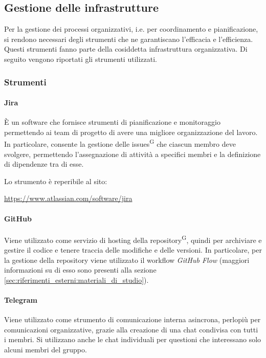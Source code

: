 \subsection{Gestione delle infrastrutture}\label{sec:processi_organizzativi:gestione_infrastrutture}
Per la gestione dei processi organizzativi, i.e. per coordinamento e pianificazione, si rendono necessari degli strumenti che ne garantiscano l'efficacia e l'efficienza. Questi strumenti fanno parte della cosiddetta infrastruttura organizzativa.
Di seguito vengono riportati gli strumenti utilizzati.

\subsubsection{Strumenti}
\paragraph{Jira}
È un software che fornisce strumenti di pianificazione e monitoraggio permettendo ai team di progetto di avere una migliore organizzazione del lavoro. In particolare, consente la gestione delle issues\textsuperscript{G} che ciascun membro deve svolgere, permettendo l'assegnazione di attività a specifici membri e la definizione di dipendenze tra di esse.
\par Lo strumento è reperibile al sito:
\begin{center}
    \url{https://www.atlassian.com/software/jira}
\end{center}

\paragraph{GitHub}
Viene utilizzato come servizio di hosting della repository\textsuperscript{G}, quindi per archiviare e gestire il codice e tenere traccia delle modifiche e delle versioni. In particolare, per la gestione della repository viene utilizzato il workflow \textit{GitHub Flow} (maggiori informazioni su di esso sono presenti alla sezione \ref{sec:riferimenti_esterni:materiali_di_studio}).

\paragraph{Telegram}
Viene utilizzato come strumento di comunicazione interna asincrona, perlopiù per comunicazioni organizzative, grazie alla creazione di una chat condivisa con tutti i membri. Si utilizzano anche le chat individuali per questioni che interessano solo alcuni membri del gruppo.

